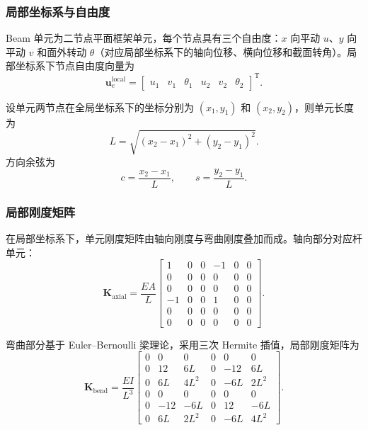 \documentclass[UTF8,a4paper,zihao=-4]{ctexart}
\newcommand{\T}{\mathrm{T}}
\newcommand{\Kmat}{\bm{K}}
\newcommand{\Uvec}{\bm{u}}
\begin{document}
\subsubsection{局部坐标系与自由度}

Beam 单元为二节点平面框架单元，每个节点具有三个自由度：$x$ 向平动 $u$、$y$ 向平动 $v$ 和面外转动 $\theta$（对应局部坐标系下的轴向位移、横向位移和截面转角）。局部坐标系下节点自由度向量为
\begin{equation}
    \Uvec_e^{\mathrm{local}} =
    \begin{bmatrix}
        u_1 & v_1 & \theta_1 & u_2 & v_2 & \theta_2
    \end{bmatrix}^{\T}.
\end{equation}

设单元两节点在全局坐标系下的坐标分别为 $(x_1,y_1)$ 和 $(x_2,y_2)$，则单元长度为
\begin{equation}
    L = \sqrt{(x_2-x_1)^2+(y_2-y_1)^2}.
\end{equation}
方向余弦为
\begin{equation}
    c = \frac{x_2-x_1}{L},\qquad s = \frac{y_2-y_1}{L}.
\end{equation}

\subsubsection{局部刚度矩阵}

在局部坐标系下，单元刚度矩阵由轴向刚度与弯曲刚度叠加而成。轴向部分对应杆单元：
\begin{equation}
    \Kmat_{\mathrm{axial}} =
    \frac{EA}{L}
    \begin{bmatrix}
        1 & 0 & 0 & -1 & 0 & 0\\
        0 & 0 & 0 & 0 & 0 & 0\\
        0 & 0 & 0 & 0 & 0 & 0\\
        -1 & 0 & 0 & 1 & 0 & 0\\
        0 & 0 & 0 & 0 & 0 & 0\\
        0 & 0 & 0 & 0 & 0 & 0
    \end{bmatrix}.
\end{equation}

弯曲部分基于 Euler--Bernoulli 梁理论，采用三次 Hermite 插值，局部刚度矩阵为
\begin{equation}
    \Kmat_{\mathrm{bend}} =
    \frac{EI}{L^3}
    \begin{bmatrix}
        0 & 0 & 0 & 0 & 0 & 0\\
        0 & 12 & 6L & 0 & -12 & 6L\\
        0 & 6L & 4L^2 & 0 & -6L & 2L^2\\
        0 & 0 & 0 & 0 & 0 & 0\\
        0 & -12 & -6L & 0 & 12 & -6L\\
        0 & 6L & 2L^2 & 0 & -6L & 4L^2
    \end{bmatrix}.
\end{equation}
\end{document}
